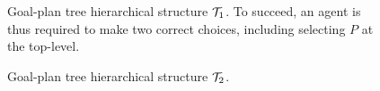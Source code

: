\begin{figure}
\begin{center}

\end{center}
\caption{Goal-plan tree hierarchical structure ${\mathcal{T}}_1$. To succeed, an agent is thus required to make
two correct choices, including selecting $P$ at the top-level.}
\label{fig:T1}
\end{figure}


\begin{figure}
\begin{center}

\end{center}
\caption{Goal-plan tree hierarchical structure ${\mathcal{T}}_2$.}
\label{fig:T2}
\end{figure}


